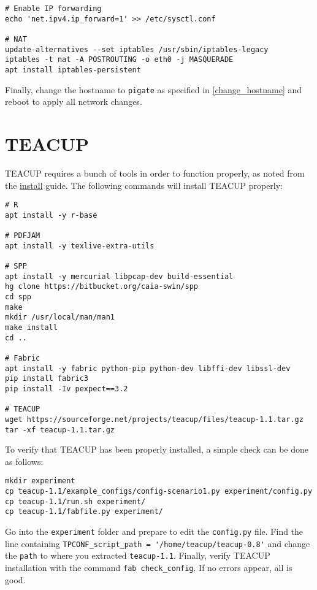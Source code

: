 \begin{lstlisting}
# Enable IP forwarding
echo 'net.ipv4.ip_forward=1' >> /etc/sysctl.conf

# NAT
update-alternatives --set iptables /usr/sbin/iptables-legacy
iptables -t nat -A POSTROUTING -o eth0 -j MASQUERADE
apt install iptables-persistent
\end{lstlisting}

Finally, change the hostname to \lstinline{pigate} as specified in \ref{change_hostname} and reboot to apply all network changes.



\section{TEACUP}

TEACUP requires a bunch of tools in order to function properly, as noted from the \href{http://caia.swin.edu.au/tools/teacup/TEACUP-0.9_INSTALL.txt}{install} guide. The following commands will install TEACUP properly:

\begin{lstlisting}
# R
apt install -y r-base

# PDFJAM
apt install -y texlive-extra-utils

# SPP
apt install -y mercurial libpcap-dev build-essential
hg clone https://bitbucket.org/caia-swin/spp
cd spp
make
mkdir /usr/local/man/man1
make install
cd ..

# Fabric
apt install -y fabric python-pip python-dev libffi-dev libssl-dev
pip install fabric3
pip install -Iv pexpect==3.2

# TEACUP
wget https://sourceforge.net/projects/teacup/files/teacup-1.1.tar.gz
tar -xf teacup-1.1.tar.gz
\end{lstlisting}

To verify that TEACUP has been properly installed, a simple check can be done as follows:

\begin{lstlisting}
mkdir experiment
cp teacup-1.1/example_configs/config-scenario1.py experiment/config.py
cp teacup-1.1/run.sh experiment/
cp teacup-1.1/fabfile.py experiment/
\end{lstlisting}

Go into the \lstinline{experiment} folder and prepare to edit the \lstinline{config.py} file. Find the line containing \lstinline{TPCONF_script_path = '/home/teacup/teacup-0.8'} and change the \lstinline{path} to where you extracted \lstinline{teacup-1.1}. Finally, verify TEACUP installation with the command \lstinline{fab check_config}. If no errors appear, all is good.


